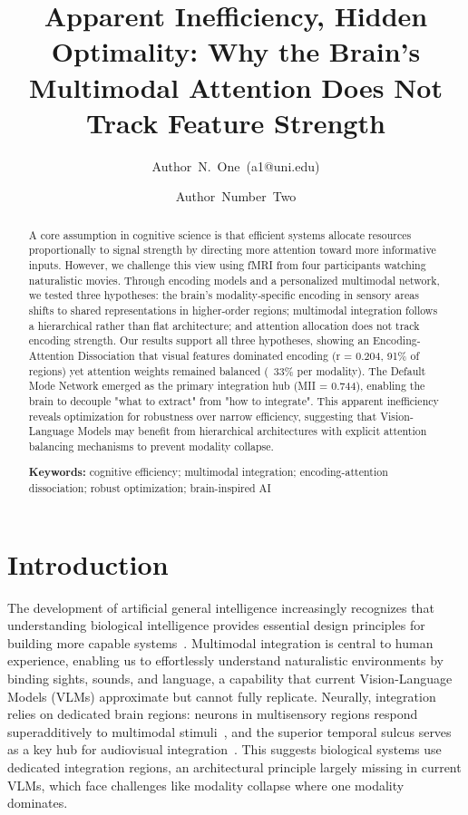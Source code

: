 \documentclass[10pt,letterpaper]{article}
\title{Apparent Inefficiency, Hidden Optimality: Why the Brain's Multimodal Attention Does Not Track Feature Strength}
\author[1]{\mbox{Author N. One (a1@uni.edu)}}
\author[2]{\mbox{Author Number Two}}
\affil[1]{Department of Hypothetical Sciences, University of Illustrations}
\affil[2]{Department of Example Studies, University of Demonstrations}
\begin{document}
\maketitle

\begin{abstract}
A core assumption in cognitive science is that efficient systems allocate resources proportionally to signal strength by directing more attention toward more informative inputs. However, we challenge this view using fMRI from four participants watching naturalistic movies. Through encoding models and a personalized multimodal network, we tested three hypotheses: the brain's modality‑specific encoding in sensory areas shifts to shared representations in higher‑order regions; multimodal integration follows a hierarchical rather than flat architecture; and attention allocation does not track encoding strength. Our results support all three hypotheses, showing an Encoding-Attention Dissociation that visual features dominated encoding (r = 0.204, 91\% of regions) yet attention weights remained balanced (~33\% per modality). The Default Mode Network emerged as the primary integration hub (MII = 0.744), enabling the brain to decouple "what to extract" from "how to integrate". This apparent inefficiency reveals optimization for robustness over narrow efficiency, suggesting that Vision-Language Models may benefit from hierarchical architectures with explicit attention balancing mechanisms to prevent modality collapse.

\textbf{Keywords:}
cognitive efficiency; multimodal integration; encoding-attention dissociation; robust optimization; brain-inspired AI
\end{abstract}

\section{Introduction}

The development of artificial general intelligence increasingly recognizes that understanding biological intelligence provides essential design principles for building more capable systems~\citep{hassabis2017neuroscience,zador2023catalyzing}. Multimodal integration is central to human experience, enabling us to effortlessly understand naturalistic environments by binding sights, sounds, and language, a capability that current Vision-Language Models (VLMs) approximate but cannot fully replicate. Neurally, integration relies on dedicated brain regions: neurons in multisensory regions respond superadditively to multimodal stimuli~\citep{stein1993merging}, and the superior temporal sulcus serves as a key hub for audiovisual integration~\citep{beauchamp2004unraveling}. This suggests biological systems use dedicated integration regions, an architectural principle largely missing in current VLMs, which face challenges like modality collapse where one modality dominates.
\end{document}
